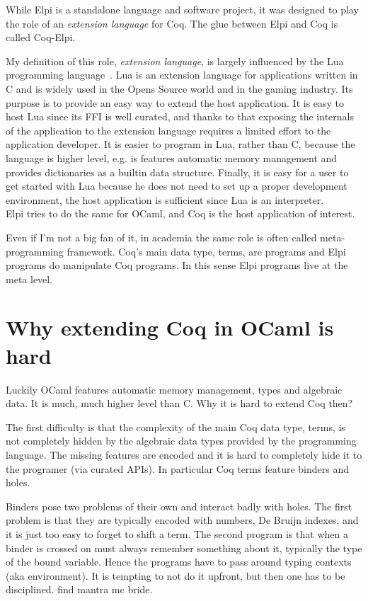 \documentclass[a4paper, 11pt]{book}
\begin{document}
While Elpi is a standalone language and software project, it was designed to
play the role of an \emph{extension language} for Coq. The glue between Elpi and
Coq is called Coq-Elpi.

My definition of this role, \emph{extension language}, is largely influenced
by the Lua programming language~\cite{10.5555/1200583}. Lua is an extension
language for applications written in C and is widely used in the Opens Source
world and in the gaming industry.
Its purpose is to provide an easy way to extend the host application.
It is easy to host Lua since its FFI is well curated, and thanks to that
exposing the internals of the application to the extension language requires a
limited effort to the application developer. It is easier to program in Lua,
rather than C, because the language is higher level, e.g. is features automatic
memory management and provides dictionaries as a builtin data structure.
Finally, it is easy for a user to get started with Lua because he does not need
to set up a proper development environment, the host application is sufficient
since Lua is an interpreter.\\
Elpi tries to do the same for OCaml, and Coq is the host application of interest.

Even if I'm not a big fan of it, in academia the same role is often called
meta-programming framework. Coq's main data type, terms, are programs and Elpi
programs do manipulate Coq programs. In this sense Elpi programs live at the
meta level.

\section{Why extending Coq in OCaml is hard}

Luckily OCaml features automatic memory management, types and algebraic data.
It is much, much higher level than C. Why it is hard to extend Coq then?

The first difficulty is that the complexity of the main Coq data type, terms,
is not completely hidden by the algebraic data types provided by the programming
language. The missing features are encoded and it is hard to completely hide
it to the programer (via curated APIs). In particular Coq terms feature binders
and holes. 

Binders pose two problems of their own and interact badly with holes.
The first problem is that they are typically encoded with numbers, De Bruijn
indexes, and it is just too easy to forget to shift a term.  The second program
is that when a binder is crossed on must always remember something about it,
typically the type of the bound variable. Hence the programs have to pass around
typing contexts (aka environment). It is tempting to not do it upfront, but
then one has to be disciplined. find mantra mc bride.
\end{document}
